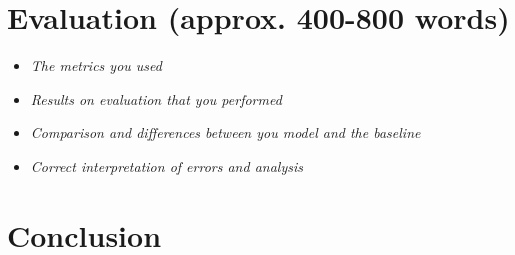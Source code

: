 \documentclass[a4paper]{article}
\begin{document}
\section{Evaluation (approx. 400-800 words)}

\begin{itemize}
    \item \textit{The metrics you used}
    \item \textit{Results on evaluation that you performed}
    \item \textit{Comparison and differences between you model and the baseline}
    \item \textit{Correct interpretation of errors and analysis}
\end{itemize}
\section{Conclusion}






\end{document}
